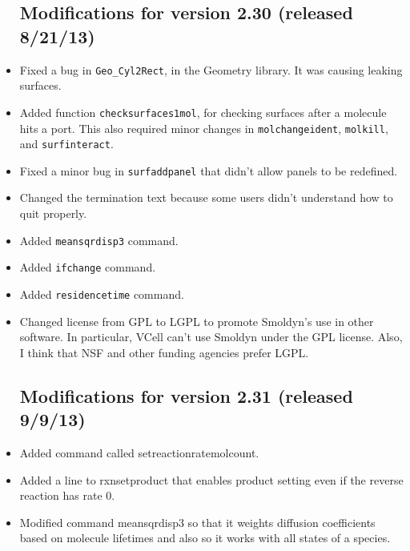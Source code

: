 \documentclass {scrbook}
\newcommand {\ttt} {\texttt}
\begin{document}
\begin{itemize}
\subsection{Modifications for version 2.30 (released 8/21/13)}
\item Fixed a bug in \ttt{Geo\_Cyl2Rect}, in the Geometry library. It was causing leaking surfaces.
\item Added function \ttt{checksurfaces1mol}, for checking surfaces after a molecule hits a port. This also required minor changes in \ttt{molchangeident}, \ttt{molkill}, and \ttt{surfinteract}.
\item Fixed a minor bug in \ttt{surfaddpanel} that didn't allow panels to be redefined.
\item Changed the termination text because some users didn't understand how to quit properly.
\item Added \ttt{meansqrdisp3} command.
\item Added \ttt{ifchange} command.
\item Added \ttt{residencetime} command.
\item Changed license from GPL to LGPL to promote Smoldyn's use in other software. In particular, VCell can't use Smoldyn under the GPL license. Also, I think that NSF and other funding agencies prefer LGPL.

\subsection{Modifications for version 2.31 (released 9/9/13)}
\item Added command called setreactionratemolcount.
\item Added a line to rxnsetproduct that enables product setting even if the reverse reaction has rate 0.
\item Modified command meansqrdisp3 so that it weights diffusion coefficients based on molecule lifetimes and also so it works with all states of a species.


\end{itemize}
\end{document}
